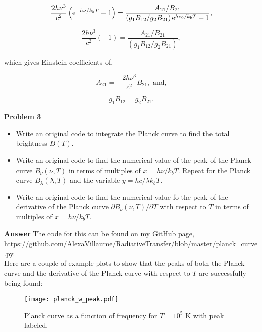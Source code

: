 \documentclass[12pt]{article}
\begin{document}
\begin{itemize}
\begin{equation}
\frac{2h\nu^3}{c^2}\left({\rm e}^{-h\nu/k_bT} - 1 \right) = \frac{A_{21}/B_{21}}{\left(g_1B_{12}/g_2B_{21}\right){\rm e}^{h\nu_0/k_bT} + 1},
\end{equation}

\begin{equation}
\frac{2h\nu^3}{c^2}\left(- 1 \right) = \frac{A_{21}/B_{21}}{\left(g_1B_{12}/g_2B_{21}\right)},
\end{equation}

\noindent which gives Einstein coefficients of, 

\begin{equation}
A_{21} = - \frac{2h\nu^3}{c^2}B_{21}, \text{ and,}
\end{equation}

\begin{equation}
g_1B_{12} = g_2B_{21}.
\end{equation}

\end{itemize}

\noindent \textbf{Problem 3}

\begin{itemize}
\item Write an original code to integrate the Planck curve to find the total brightness $B\left(T\right)$.

\item Write an original code to find the numerical value of the peak of the Planck curve $B_\nu(\nu, T)$ in terms of multiples of $x=h\nu/k_bT$. Repeat for the Planck curve $B_\lambda(\lambda, T)$ and the variable $y=hc/\lambda k_bT$.

\item Write an original code to find the numerical value fo the peak of the derivative of the Planck curve $\partial B_\nu\left(\nu, T\right)/\partial T$ with respect to $T$ in terms of multiples of $x = h\nu/k_bT$.
\end{itemize}

\noindent \textbf{Answer} The code for this can be found on my GitHub page, \url{https://github.com/AlexaVillaume/RadiativeTransfer/blob/master/planck_curve.py}. \\

\noindent Here are a couple of example plots to show that the peaks of both the Planck curve and the derivative of the Planck curve with respect to $T$ are successfully being found:

\begin{figure}[b!]
\texttt{[image: planck\_w\_peak.pdf]}
\caption{Planck curve as a function of frequency  for $T = 10^5$ K with peak labeled.}
\end{figure}
\end{document}
